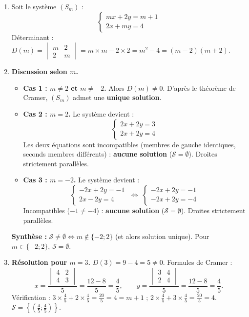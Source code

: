 \documentclass[11pt]{article}
\begin{document}
\begin{corrige}
\begin{enumerate}
\item Soit le système $(S_m)$ :
\[ \begin{cases} mx + 2y = m+1 \\ 2x + my = 4 \end{cases} \]
Déterminant : $D(m) = \begin{vmatrix} m & 2 \\ 2 & m \end{vmatrix} = m\times m - 2\times 2 = m^2 - 4 = (m-2)(m+2)$.

\item \textbf{Discussion selon $m$.}
\begin{itemize}
\item \textbf{Cas 1 : $m \neq 2$ et $m \neq -2$.} Alors $D(m) \neq 0$. D'après le théorème de Cramer, $(S_m)$ admet une \textbf{unique solution}.
\item \textbf{Cas 2 : $m = 2$.} Le système devient :
\[ \begin{cases} 2x + 2y = 3 \\ 2x + 2y = 4 \end{cases} \]
Les deux équations sont incompatibles (membres de gauche identiques, seconds membres différents) : \textbf{aucune solution} ($\mathcal{S} = \emptyset$). Droites strictement parallèles.
\item \textbf{Cas 3 : $m = -2$.} Le système devient :
\[ \begin{cases} -2x + 2y = -1 \\ 2x - 2y = 4 \end{cases} \;\Leftrightarrow\; \begin{cases} -2x + 2y = -1 \\ -2x + 2y = -4 \end{cases} \]
Incompatibles ($-1 \neq -4$) : \textbf{aucune solution} ($\mathcal{S} = \emptyset$). Droites strictement parallèles.
\end{itemize}
\textbf{Synthèse :} $\mathcal{S} \neq \emptyset \iff m \notin \{-2; 2\}$ (et alors solution unique). Pour $m \in \{-2; 2\}$, $\mathcal{S} = \emptyset$.

\item \textbf{Résolution pour $m = 3$.}
$D(3) = 9 - 4 = 5 \neq 0$.
Formules de Cramer :
\[ x = \frac{\begin{vmatrix} 4 & 2 \\ 4 & 3 \end{vmatrix}}{5} = \frac{12 - 8}{5} = \frac{4}{5}, \qquad
   y = \frac{\begin{vmatrix} 3 & 4 \\ 2 & 4 \end{vmatrix}}{5} = \frac{12 - 8}{5} = \frac{4}{5}. \]
Vérification : $3\times\frac{4}{5} + 2\times\frac{4}{5} = \frac{20}{5} = 4 = m+1$ ; $2\times\frac{4}{5} + 3\times\frac{4}{5} = \frac{20}{5} = 4$.
$\mathcal{S} = \left\{\left(\frac{4}{5} ; \frac{4}{5}\right)\right\}$.


\end{enumerate}
\end{corrige}
\end{document}

